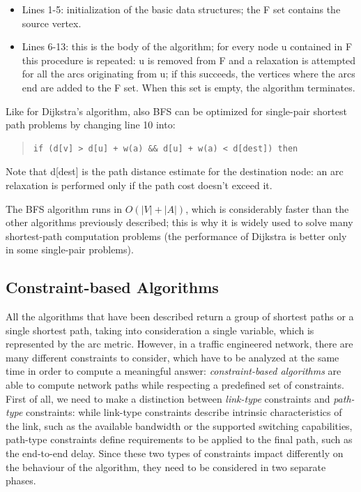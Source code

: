 \documentclass[10pt,a4paper]{report}
\begin{document}
\newpage

\begin{itemize}
\item Lines 1-5: initialization of the basic data structures; the F
  set contains the source vertex.
\item Lines 6-13: this is the body of the algorithm; for every node u
  contained in F this procedure is repeated: u is removed from F and a
  relaxation is attempted for all the arcs originating from u; if this
  succeeds, the vertices where the arcs end are added to the F
  set. When this set is empty, the algorithm terminates.
\end{itemize}

Like for Dijkstra's algorithm, also BFS can be optimized for
single-pair shortest path problems by changing line 10 into:
\begin{quote}
\begin{verbatim}
if (d[v] > d[u] + w(a) && d[u] + w(a) < d[dest]) then
\end{verbatim}
\end{quote}

Note that d[dest] is the path distance estimate for the destination
node: an arc relaxation is performed only if the path cost doesn't
exceed it.

The BFS algorithm runs in \(O(|V|+|A|)\), which is considerably faster
than the other algorithms previously described; this is why it is
widely used to solve many shortest-path computation problems (the
performance of Dijkstra is better only in some single-pair problems).

\subsection{Constraint-based Algorithms}

All the algorithms that have been described return a group of shortest
paths or a single shortest path, taking into consideration a single
variable, which is represented by the arc metric. However, in a
traffic engineered network, there are many different constraints to
consider, which have to be analyzed at the same time in order to
compute a meaningful answer: \textit{constraint-based algorithms} are
able to compute network paths while respecting a predefined set of
constraints. First of all, we need to make a distinction between
\textit{link-type} constraints and \textit{path-type} constraints:
while link-type constraints describe intrinsic characteristics of the
link, such as the available bandwidth or the supported switching
capabilities, path-type constraints define requirements to be applied
to the final path, such as the end-to-end delay. Since these two types
of constraints impact differently on the behaviour of the algorithm,
they need to be considered in two separate phases.
\end{document}
